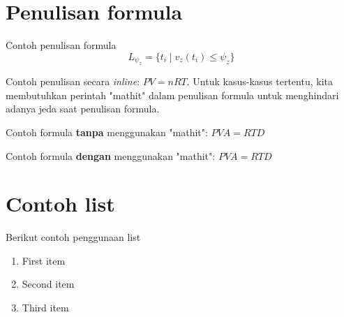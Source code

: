 \section{Penulisan formula}
Contoh penulisan formula
\begin{equation}
L_{\psi_z} = \{ t_i \mid v_z(t_i) \le \psi_z \}
\end{equation}

Contoh penulisan secara \textit{inline}: $\mathit{PV = nRT}$. Untuk kasus-kasus tertentu, kita membutuhkan perintah "mathit" dalam penulisan formula untuk menghindari adanya jeda saat penulisan formula.

Contoh formula \textbf{tanpa} menggunakan "mathit": $PVA = RTD$

Contoh formula \textbf{dengan} menggunakan "mathit": $\mathit{PVA = RTD}$



\section{Contoh list}
Berikut contoh penggunaan list
\begin{enumerate}
	\item First item
	\item Second item
	\item Third item
\end{enumerate}